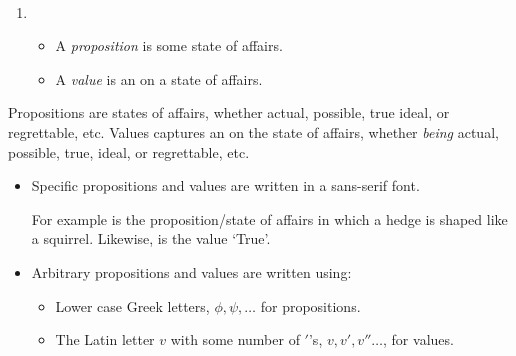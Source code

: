 \begin{note}
  \begin{definition}
    \mbox{ }%
    \vspace{-\baselineskip}
    \begin{enumerate}[noitemsep, label=]
    \item
      \begin{itemize}
      \item
        A \emph{proposition} is some state of affairs.
      \item
        A \emph{value} is an \agpe{} on a state of affairs.
      \end{itemize}
    \end{enumerate}
    \vspace{-\baselineskip}
  \end{definition}

  Propositions are states of affairs, whether actual, possible, true ideal, or regrettable, etc.
  Values captures an \agpe{} on the state of affairs, whether \emph{being} actual, possible, true, ideal, or regrettable, etc.

    \begin{itemize}[leftmargin=*]
    \item
      Specific propositions and values are written in a \textsf{sans-serif} font.

      For example  is the proposition/state of affairs in which a hedge is shaped like a squirrel.
      Likewise,  is the value `True'.
    \item
      Arbitrary propositions and values are written using:
      \begin{itemize}[noitemsep]
      \item
        Lower case Greek letters, \(\phi, \psi, \dots\) for propositions.
      \item
        The Latin letter \(v\) with some number of \('\)'s, \(v, v', v'' \dots\), for values.
      \end{itemize}
    \end{itemize}
\end{note}

